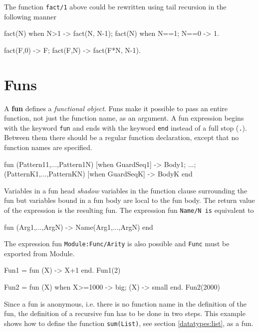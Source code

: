 The function \texttt{fact/1} above could be rewritten using tail
recursion in the following manner

 \begin{erlang}
fact(N) when N>1 -> fact(N, N-1);
fact(N) when N==1; N==0 -> 1.

fact(F,0) -> F;                 %
fact(F,N) -> fact(F*N, N-1).
\end{erlang}


\section{Funs}
\label{functions:funs}
A \textbf{fun} defines a \textit{functional object}. Funs make it
possible to pass an entire function, not just the function name, as an
argument. A fun expression begins with the keyword \texttt{fun} and
ends with the keyword \texttt{end} instead of a full stop
(\texttt{.}). Between them there should be a regular function
declaration, except that no function names are specified.

\begin{erlang}
fun
    (Pattern11,...,Pattern1N) [when GuardSeq1] ->
        Body1;
        ...;
    (PatternK1,...,PatternKN) [when GuardSeqK] ->
        BodyK
end
\end{erlang}

Variables in a fun head \textit{shadow} variables in the function
clause surrounding the fun but variables bound in a fun body are local
to the fun body. The return value of the expression is the resulting
fun. The expression fun \texttt{Name/N is} equivalent to

\begin{erlang}
fun (Arg1,...,ArgN) -> Name(Arg1,...,ArgN) end
\end{erlang}

The expression fun \texttt{Module:Func/Arity} is also possible and
\texttt{Func} must be exported from Module.

\begin{erlang}
Fun1 = fun (X) -> X+1 end.
Fun1(2)         %

Fun2 = fun (X) when X>=1000 -> big; (X) -> small end.
Fun2(2000)      %
\end{erlang}

Since a fun is anonymous, i.e. there is no function name in the
definition of the fun, the definition of a recursive fun has to be
done in two steps. This example shows how to define the function
\texttt{sum(List)}, see section \ref{datatypes:list}, as a fun.

